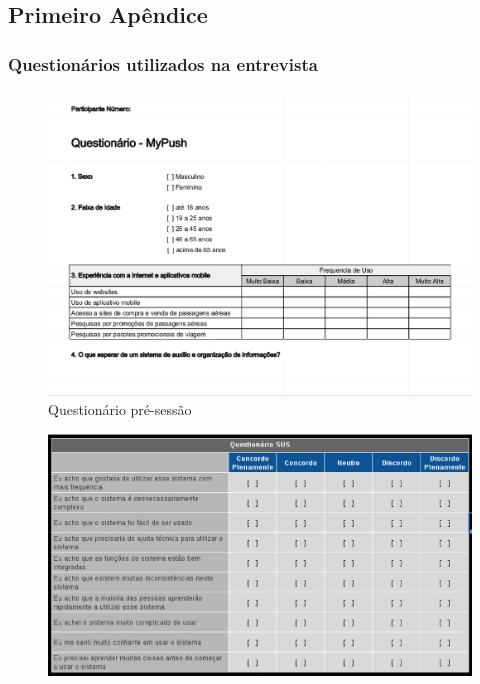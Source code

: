 \begin{apendicesenv}

\partapendices

\chapter{Primeiro Apêndice}

\subsection{Questionários utilizados na entrevista}

\begin{figure}[h]
	\centering
	\includegraphics[scale=0.5]{figuras/questionario_pre-sessao.eps}
	\caption{Questionário pré-sessão}
\end{figure}
\begin{figure}[h]
	\centering
	\includegraphics[scale=0.5]{figuras/sus2.eps}

\end{figure}
\end{apendicesenv}
